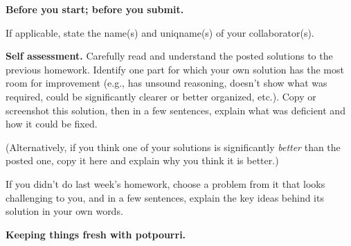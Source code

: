 \documentclass[11pt,addpoints]{exam}
\begin{document}

\hwpreface

\begin{questions}

  \addtocounter{question}{-1}
  \question \textbf{Before you start; before you submit.}


    If applicable, state the name(s) and uniqname(s) of your collaborator(s).

    \begin{solution}
       
    \end{solution}


\question[10] \textbf{Self assessment.} \nopagebreak
  Carefully read and understand the posted solutions to the previous homework.
  Identify one part for which your own solution has the most room for improvement (e.g., has unsound reasoning, doesn’t show what was required, could be significantly clearer or better organized, etc.).
  Copy or screenshot this solution, then in a few sentences, explain what was deficient and how it could be fixed.

  (Alternatively, if you think one of your solutions is significantly \emph{better} than the posted one, copy it here and explain why you think it is better.)

  If you didn't do last week's homework, choose a problem from it that looks challenging to you, and in a few sentences, explain the key ideas behind its solution in your own words.

  \begin{solution}
  
  \end{solution}

    \question \textbf{Keeping things fresh with potpourri.}
\end{questions}
\end{document}
